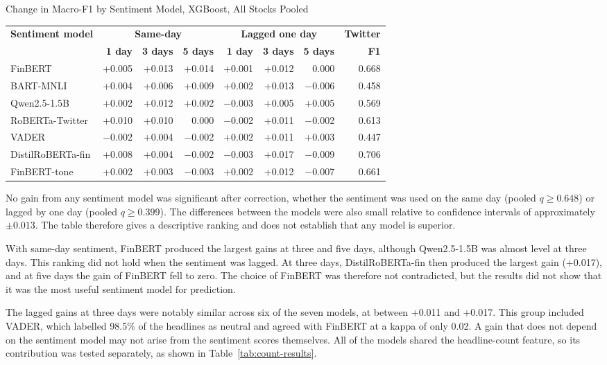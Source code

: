 \begin{utptable}{Change in Macro-F1 by Sentiment Model, XGBoost, All Stocks Pooled}
\label{tab:downstream}
\setlength{\tabcolsep}{4pt}
\begin{tabular}{@{}lrrrrrrr@{}}
\toprule
\textbf{Sentiment model} & \multicolumn{3}{c}{\textbf{Same-day}} & \multicolumn{3}{c}{\textbf{Lagged one day}} & \textbf{Twitter} \\
 & \textbf{1 day} & \textbf{3 days} & \textbf{5 days} & \textbf{1 day} & \textbf{3 days} & \textbf{5 days} & \textbf{F1} \\
\midrule
FinBERT & +0.005 & +0.013 & +0.014 & +0.001 & +0.012 & 0.000 & 0.668 \\
BART-MNLI & +0.004 & +0.006 & +0.009 & +0.002 & +0.013 & $-$0.006 & 0.458 \\
Qwen2.5-1.5B & +0.002 & +0.012 & +0.002 & $-$0.003 & +0.005 & +0.005 & 0.569 \\
RoBERTa-Twitter & +0.010 & +0.010 & 0.000 & $-$0.002 & +0.011 & $-$0.002 & 0.613 \\
VADER & $-$0.002 & +0.004 & $-$0.002 & +0.002 & +0.011 & +0.003 & 0.447 \\
DistilRoBERTa-fin & +0.008 & +0.004 & $-$0.002 & $-$0.003 & +0.017 & $-$0.009 & 0.706 \\
FinBERT-tone & +0.002 & +0.003 & $-$0.003 & +0.002 & +0.012 & $-$0.007 & 0.661 \\
\bottomrule
\end{tabular}
\end{utptable}

No gain from any sentiment model was significant after correction, whether the sentiment was used on the same day (pooled $q \geq 0.648$) or lagged by one day (pooled $q \geq 0.399$). The differences between the models were also small relative to confidence intervals of approximately $\pm 0.013$. The table therefore gives a descriptive ranking and does not establish that any model is superior.

With same-day sentiment, FinBERT produced the largest gains at three and five days, although Qwen2.5-1.5B was almost level at three days. This ranking did not hold when the sentiment was lagged. At three days, DistilRoBERTa-fin then produced the largest gain (+0.017), and at five days the gain of FinBERT fell to zero. The choice of FinBERT was therefore not contradicted, but the results did not show that it was the most useful sentiment model for prediction.

The lagged gains at three days were notably similar across six of the seven models, at between +0.011 and +0.017. This group included VADER, which labelled 98.5\% of the headlines as neutral and agreed with FinBERT at a kappa of only 0.02. A gain that does not depend on the sentiment model may not arise from the sentiment scores themselves. All of the models shared the headline-count feature, so its contribution was tested separately, as shown in Table~\ref{tab:count-results}.

